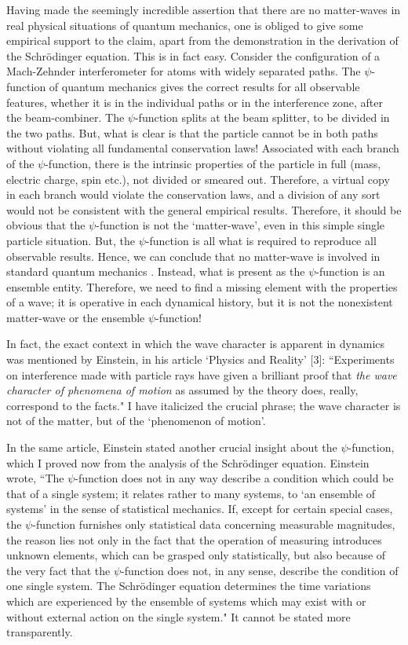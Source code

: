 Having made the seemingly incredible assertion that there are no matter-waves in real
physical situations of quantum mechanics, one is obliged to give some empirical support to
the claim, apart from the demonstration in the derivation of the Schr\"{o}dinger equation. This
is in fact easy. Consider the configuration of a Mach-Zehnder interferometer for atoms with
widely separated paths. The $\psi$-function of quantum mechanics gives the correct results for
all observable features, whether it is in the individual paths or in the interference zone, after
the beam-combiner. The $\psi$-function splits at the beam splitter, to be divided in the two
paths. But, what is clear is that the particle cannot be in both paths without violating
all fundamental conservation laws! Associated with each branch of the $\psi$-function, there is
the intrinsic properties of the particle in full (mass, electric charge, spin etc.), not divided
or smeared out. Therefore, a virtual copy in each branch would violate the conservation
laws, and a division of any sort would not be consistent with the general empirical results.
Therefore, it should be obvious that the $\psi$-function is not the `matter-wave', even in this
simple single particle situation. But, the $\psi$-function is all what is required to reproduce
all observable results. Hence, we can conclude that no matter-wave is involved in standard quantum
mechanics \cite{chap14-key2}. Instead, what is present as the $\psi$-function is an ensemble entity. Therefore,
we need to find a missing element with the properties of a wave; it is operative in each dynamical history, but it is not
the nonexistent matter-wave or the ensemble $\psi$-function!

In fact, the exact context in which the wave character is apparent in dynamics was
mentioned by Einstein, in his article `Physics and Reality' [3]: ``Experiments on interference
made with particle rays have given a brilliant proof that \textit{the wave character of phenomena of
motion} as assumed by the theory does, really, correspond to the facts." I have italicized the
crucial phrase; the wave character is not of the matter, but of the `phenomenon of motion'.

In the same article, Einstein stated another crucial insight about the $\psi$-function, which I
proved now from the analysis of the Schr\"{o}dinger equation. Einstein wrote, “The $\psi$-function
does not in any way describe a condition which could be that of a single system; it relates
rather to many systems, to `an ensemble of systems' in the sense of statistical mechanics.
If, except for certain special cases, the $\psi$-function furnishes only statistical data concerning
measurable magnitudes, the reason lies not only in the fact that the operation of measuring
introduces unknown elements, which can be grasped only statistically, but also because of
the very fact that the $\psi$-function does not, in any sense, describe the condition of one single
system. The Schr\"{o}dinger equation determines the time variations which are experienced
by the ensemble of systems which may exist with or without external action on the single
system." It cannot be stated more transparently.

